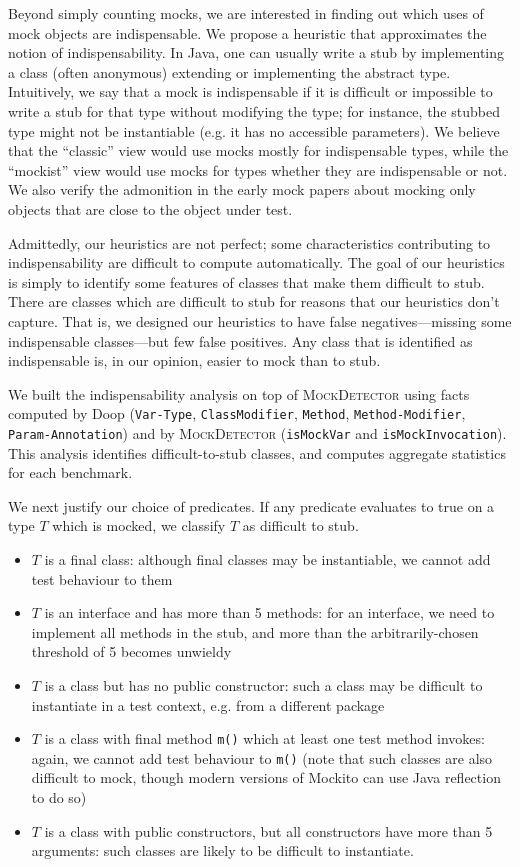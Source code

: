 Beyond simply counting mocks, we are interested in finding out which
uses of mock objects are indispensable.  We propose a heuristic that
approximates the notion of indispensability. In Java, one can usually
write a stub by implementing a class (often anonymous) extending or
implementing the abstract type. Intuitively, we say that a mock is
indispensable if it is difficult or impossible to write a stub for
that type without modifying the type; for instance, the stubbed type might
not be instantiable (e.g. it has no accessible parameters). We believe that
the ``classic'' view would use mocks mostly for indispensable types, while
the ``mockist'' view would use mocks for types whether they are indispensable or not.
We also verify the admonition in the early mock papers about mocking only objects
that are close to the object under test.

Admittedly, our heuristics are not perfect; some characteristics contributing
to indispensability are difficult to compute automatically. The goal of our heuristics
is simply to identify some features of classes that make them difficult to stub.
There are classes which are difficult to stub for reasons that our heuristics don't capture.
That is, we designed our heuristics to have false negatives---missing some indispensable
classes---but few false positives. Any class that is identified as indispensable is,
in our opinion, easier to mock than to stub.

We built the indispensability analysis on top of \textsc{MockDetector}
using facts computed by Doop
(\texttt{Var-Type}, \texttt{ClassModifier}, \texttt{Method}, \texttt{Method-Modifier}, \texttt{Param-Annotation})
and by \textsc{MockDetector} (\texttt{isMockVar}
and \texttt{isMockInvocation}). This analysis identifies difficult-to-stub classes, and
computes aggregate statistics for each benchmark.

We next justify our choice of predicates. If any predicate evaluates to true on a type $T$ which is mocked, we 
classify $T$ as difficult to stub.

\begin{itemize}
\item $T$ is a final class: although final classes may be instantiable, we cannot add test behaviour to them
\item $T$ is an interface and has more than 5 methods: for an interface, we need to implement all methods in the stub, and more than the arbitrarily-chosen threshold of 5 becomes unwieldy
\item $T$ is a class but has no public constructor: such a class may be difficult to instantiate in a test context, e.g. from a different package
\item $T$ is a class with final method \texttt{m()} which at least one test method invokes: again, we cannot add test behaviour to \texttt{m()} (note that such classes are also difficult to mock, though modern versions of Mockito can use Java reflection to do so)
\item $T$ is a class with public constructors, but all constructors have more than 5 arguments: such classes are likely to be difficult to instantiate.
\end{itemize}


